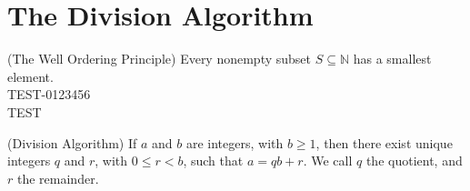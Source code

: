\newpage

\section{The Division Algorithm} 

\begin{axiom}{(The Well Ordering Principle)}
Every nonempty subset $S \subseteq \mathbb{N}$ has a smallest element. \\ TEST-0123456\\
TEST \cite{apostol1976}
\end{axiom}

\begin{theorem}{(Division Algorithm)}
If $a$ and $b$ are integers, with $b \geq 1$, then there exist unique integers $q$ and $r$, with $0 \le r < b$, such that $a = qb + r$. 
We call $q$ the quotient, and $r$ the remainder.
\end{theorem}

